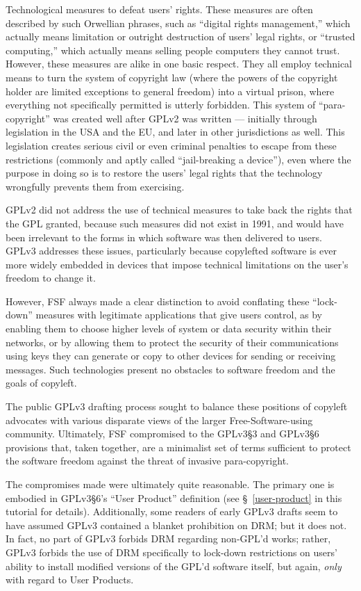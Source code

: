 Technological measures to defeat users' rights.  These measures are often
described by such Orwellian phrases, such as ``digital rights management,''
which actually means limitation or outright destruction of users' legal
rights, or ``trusted computing,'' which actually means selling people
computers they cannot trust.  However, these measures are alike in one basic
respect.  They all employ technical means to turn the system of copyright law
(where the powers of the copyright holder are limited exceptions to general
freedom) into a virtual prison, where everything not specifically permitted
is utterly forbidden.  This system of ``para-copyright'' was created well
after GPLv2 was written --- initially through legislation in the USA and the
EU, and later in other jurisdictions as well.  This legislation creates
serious civil or even criminal penalties to escape from these restrictions
(commonly and aptly called ``jail-breaking a device''), even where the
purpose in doing so is to restore the users' legal rights that the technology
wrongfully prevents them from exercising.

GPLv2 did not address the use of technical measures to take back the rights
that the GPL granted, because such measures did not exist in 1991, and would
have been irrelevant to the forms in which software was then delivered to
users.  GPLv3 addresses these issues, particularly because copylefted
software is ever more widely embedded in devices that impose technical
limitations on the user's freedom to change it.

However, FSF always made a clear distinction to avoid conflating these
``lock-down'' measures with legitimate applications that give users control,
as by enabling them to choose higher levels of system or data security within
their networks, or by allowing them to protect the security of their
communications using keys they can generate or copy to other devices for
sending or receiving messages.  Such technologies present no obstacles to
software freedom and the goals of copyleft.

The public GPLv3 drafting process sought to balance these positions of
copyleft advocates with various disparate views of the larger
Free-Software-using community.  Ultimately, FSF compromised to the GPLv3\S3
and GPLv3\S6 provisions that, taken together, are a minimalist set of terms
sufficient to protect the software freedom against the threat of invasive
para-copyright.

The compromises made were ultimately quite reasonable.  The primary one is
embodied in GPLv3\S6's ``User Product'' definition (see \S~\ref{user-product}
in this tutorial for details).  Additionally, some readers of early GPLv3
drafts seem to have assumed GPLv3 contained a blanket prohibition on DRM; but
it does not.  In fact, no part of GPLv3 forbids DRM regarding non-GPL'd
works; rather, GPLv3 forbids the use of DRM specifically to lock-down
restrictions on users' ability to install modified versions of the GPL'd
software itself, but again, \textit{only} with regard to User Products.

